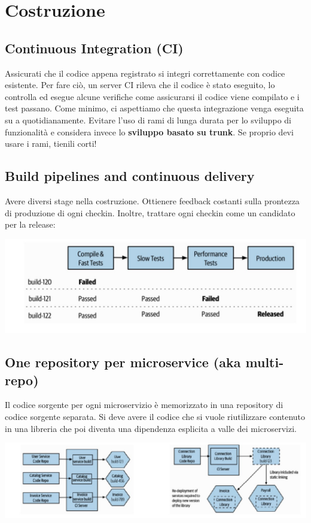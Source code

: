 \section{Costruzione}
\subsection{Continuous Integration (CI)}
Assicurati che il codice appena registrato si integri correttamente con
codice esistente. Per fare ciò, un server CI rileva che il codice è stato eseguito,
lo controlla ed esegue alcune verifiche come assicurarsi
il codice viene compilato e i test passano.
Come minimo, ci aspettiamo che questa integrazione venga eseguita su a
quotidianamente.
Evitare l'uso di rami di lunga durata per lo sviluppo di funzionalità e
considera invece lo \textbf{sviluppo basato su trunk}. Se proprio devi usare i rami, tienili corti!

\subsection{Build pipelines and continuous delivery}
Avere diversi stage nella costruzione. Ottienere feedback costanti sulla prontezza di produzione di ogni checkin. Inoltre, trattare ogni checkin come un candidato per la release:
\begin{center}
    \includegraphics[scale = 0.4]{Images/SOA/Build.jpg}
\end{center}

\subsection{One repository per microservice (aka multi-repo)}
Il codice sorgente per ogni microservizio è memorizzato in una repository di codice sorgente separata. Si deve avere il codice che si vuole riutilizzare contenuto in una libreria che poi diventa una dipendenza esplicita a valle dei microservizi.
\begin{center}
    \includegraphics[scale = 0.4]{Images/SOA/MultiRepo.jpg}
\end{center}

